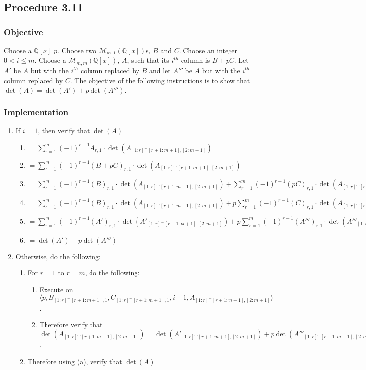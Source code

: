 \documentclass[twocolumn]{article}
\newcommand{\procedure}[2][]{\subsection*{Procedure #2 \ifthenelse{\equal{#1}{}}{}{(#1)}}\label{sec:procedure #2}}
\newcommand{\objective}{\subsubsection*{Objective}}
\newcommand{\implementation}{\subsubsection*{Implementation}}
\newcommand{\procedurehr}[2][]{\hyperref[sec:procedure #2]{\ifthenelse{\equal{#1}{}}{procedure #2}{#1}}}
\begin{document}
		\procedure{3.11}
			\objective
				Choose a $\mathbb{Q}[x]$ $p$. Choose two $\mathcal{M}_{m,1}(\mathbb{Q}[x])$s, $B$ and $C$. Choose an integer $0<i\le m$. Choose a $\mathcal{M}_{m,m}(\mathbb{Q}[x])$, $A$, such that its $i^{th}$ column is $B+pC$. Let $A'$ be $A$ but with the $i^{th}$ column replaced by $B$ and let $A'''$ be $A$ but with the $i^{th}$ column replaced by $C$. The objective of the following instructions is to show that $\det(A)=\det(A') + p\det(A''')$.
			\implementation
				\begin{enumerate}
					\item If $i=1$, then verify that $\det(A)$
					\begin{enumerate}
						\item $=\sum_{r=1}^m (-1)^{r-1}A_{r,1}\cdot\det(A_{[1:r]^\frown[r+1:m+1],[2:m+1]})$
						\item $=\sum_{r=1}^m (-1)^{r-1}(B+pC)_{r,1}\cdot\det(A_{[1:r]^\frown[r+1:m+1],[2:m+1]})$
						\item $=\sum_{r=1}^m (-1)^{r-1}(B)_{r,1}\cdot\det(A_{[1:r]^\frown[r+1:m+1],[2:m+1]})+\sum_{r=1}^m (-1)^{r-1}(pC)_{r,1}\cdot\det(A_{[1:r]^\frown[r+1:m+1],[2:m+1]})$
						\item $=\sum_{r=1}^m (-1)^{r-1}(B)_{r,1}\cdot\det(A_{[1:r]^\frown[r+1:m+1],[2:m+1]})+p\sum_{r=1}^m (-1)^{r-1}(C)_{r,1}\cdot\det(A_{[1:r]^\frown[r+1:m+1],[2:m+1]})$
						\item $=\sum_{r=1}^m (-1)^{r-1}(A')_{r,1}\cdot\det(A'_{[1:r]^\frown[r+1:m+1],[2:m+1]})+p\sum_{r=1}^m (-1)^{r-1}(A''')_{r,1}\cdot\det(A'''_{[1:r]^\frown[r+1:m+1],[2:m+1]})$
						\item $=\det(A')+p\det(A''')$
					\end{enumerate}
					\item Otherwise, do the following:
					\begin{enumerate}
						\item For $r=1$ to $r=m$, do the following:
						\begin{enumerate}
							\item Execute \procedurehr{3.11} on $\langle p,B_{[1:r]^\frown[r+1:m+1],1},C_{[1:r]^\frown[r+1:m+1],1},i-1,\allowbreak A_{[1:r]^\frown[r+1:m+1],[2:m+1]}\rangle$.
							\item Therefore verify that $\det(A_{[1:r]^\frown[r+1:m+1],[2:m+1]})=\det(A'_{[1:r]^\frown[r+1:m+1],[2:m+1]})+p\det(A'''_{[1:r]^\frown[r+1:m+1],[2:m+1]})$.
						\end{enumerate}
						\item Therefore using (a), verify that $\det(A)$

\end{enumerate}
\end{enumerate}
\end{document}
